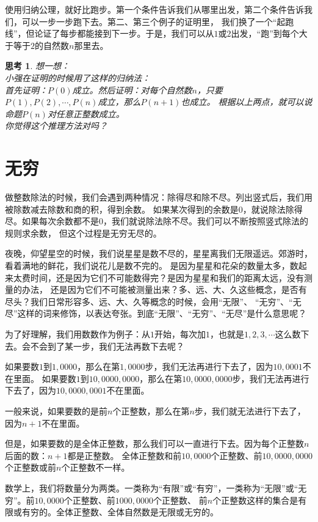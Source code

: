 \documentclass[12pt,UTF8]{ctexbook}
\newtheorem{sk}{思考}[section]
\begin{document}
使用归纳公理，就好比跑步。第一个条件告诉我们从哪里出发，第二个条件告诉我们，可以一步一步跑下去。第二、第三个例子的证明里，
我们换了一个“起跑线”，但论证了每步都能接到下一步。于是，我们可以从$1$或$2$出发，“跑”到每个大于等于$2$的自然数$n$那里去。

\begin{sk}\label{sk:2-2-1}
    想一想：\\
    小强在证明的时候用了这样的归纳法：\\
    首先证明：$P(0)$成立。然后证明：对每个自然数$n$，只要$P(1), P(2), \cdots , P(n)$成立，那么$P(n+1)$也成立。
    根据以上两点，就可以说命题$P(n)$对任意正整数成立。\\
    你觉得这个推理方法对吗？
\end{sk}

\section{无穷}
做整数除法的时候，我们会遇到两种情况：除得尽和除不尽。列出竖式后，我们用被除数减去除数和商的积，得到余数。
如果某次得到的余数是$0$，就说除法除得尽。如果每次余数都不是$0$，我们就说除法除不尽。我们可以不断按照竖式除法的规则求余数，
但这个过程是无穷无尽的。

夜晚，仰望星空的时候，我们说星星是数不尽的，星星离我们无限遥远。郊游时，看着满地的鲜花，我们说花儿是数不完的。
是因为星星和花朵的数量太多，数起来太费时间，还是因为它们不可能数得完？是因为星星和我们的距离太远，没有测量的办法，
还是因为它们不可能被测量出来？多、远、大、久这些概念，是否有尽头？我们日常形容多、远、大、久等概念的时候，会用“无限”、
“无穷”、“无尽”这样的词来修饰，以表达夸张。到底“无限”、“无穷”、“无尽”是什么意思呢？

为了好理解，我们用数数作为例子：从$1$开始，每次加$1$，也就是$1,2,3,\cdots$这么数下去。会不会到了某一步，我们无法再数下去呢？

如果要数$1$到$1,0000$，那么在第$1,0000$步，我们无法再进行下去了，因为$10,0001$不在里面。
如果要数$1$到$10,0000,0000$，那么在第$10,0000,0000$步，我们无法再进行下去了，因为$10,0000,0001$不在里面。

一般来说，如果要数的是前$n$个正整数，那么在第$n$步，我们就无法进行下去了，因为$n+1$不在里面。

但是，如果要数的是全体正整数，那么我们可以一直进行下去。因为每个正整数$n$后面的数：$n+1$都是正整数。
全体正整数和前$10,0000$个正整数、前$10,0000,0000$个正整数或前$n$个正整数不一样。

数学上，我们将数量分为两类。一类称为“有限”或“有穷”，一类称为“无限”或“无穷”。前$10,0000$个正整数、前$1000,0000$个正整数、
前$n$个正整数这样的集合是有限或有穷的。全体正整数、全体自然数是无限或无穷的。
\end{document}
